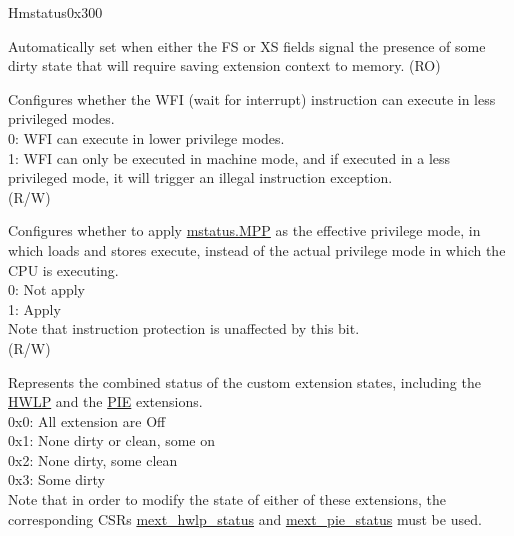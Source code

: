 \begin{register}{H}{mstatus}{0x300}\label{regdesc:MSTATUS}
%
%
%
%
%
%
%
%
%
%
%
%
%
%
%
\regnewline%
\begin{regdesc}\begin{reglist}
\label{fielddesc:MSTATUS_SD}\item [SD] Automatically set when either the FS or XS fields signal the presence of some dirty state that will require saving extension context to memory. (RO)
\label{fielddesc:MSTATUSTW}\item [TW] Configures whether the WFI (wait for interrupt) instruction can execute in less privileged modes. \\
0: WFI can execute in lower privilege modes.\\
1: WFI can only be executed in machine mode, and if executed in a less privileged mode, it will trigger an illegal instruction exception.\\
(R/W)
\label{fielddesc:MSTATUS_MPRV}\item [MPRV] Configures whether to apply \hyperref[fielddesc:MSTATUSMPP]{mstatus.MPP} as the effective privilege mode, in which loads and stores execute, instead of the actual privilege mode in which the CPU is executing. \\
0: Not apply\\
1: Apply\\
Note that instruction protection is unaffected by this bit.\\
(R/W)
\label{fielddesc:MSTATUS_XS}\item [XS] Represents the combined status of the custom extension states, including the \hyperref[sec:riscvcpu-hwloop]{HWLP} and the \hyperref[sec:riscvcpu-pie]{PIE} extensions. \\
0x0: All extension are Off\\
0x1: None dirty or clean, some on\\
0x2: None dirty, some clean\\
0x3: Some dirty\\
Note that in order to modify the state of either of these extensions, the corresponding CSRs \hyperref[regdesc:MEXT_HWLP_STATUS]{mext\_hwlp\_status} and \hyperref[regdesc:MEXT_PIE_STATUS]{mext\_pie\_status} must be used.\\

\end{reglist}
\end{regdesc}
\end{register}
